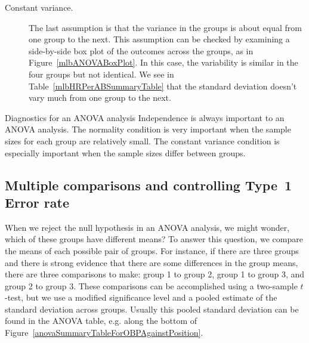 \begin{description}
\item[Constant variance.]
    The last assumption is that the variance in the
    groups is about equal from one group to the next.
    This assumption can be checked by examining a
    side-by-side box plot of the outcomes across the
    groups, as in Figure~\vref{mlbANOVABoxPlot}.
    In this case, the variability is similar in the
    four groups but not identical.
    We see in Table~\vref{mlbHRPerABSummaryTable}
    that the standard deviation doesn't vary much
    from one group to the next.


\end{description}

\begin{onebox}{Diagnostics for an ANOVA analysis}
  Independence is always important to an ANOVA analysis.
  The normality condition is very important when the sample
  sizes for each group are relatively small.
  The constant variance condition is especially important
  when the sample sizes differ between groups.
\end{onebox}


\subsection{Multiple comparisons and controlling Type~1 Error rate}
\label{multipleComparisonsAndControllingTheType1ErrorRate}


When we reject the null hypothesis in an ANOVA analysis, we might wonder, which of these groups have different means? To answer this question, we compare the means of each possible pair of groups. For instance, if there are three groups and there is strong evidence that there are some differences in the group means, there are three comparisons to make: group 1 to group 2, group 1 to group 3, and group 2 to group 3. These comparisons can be accomplished using a two-sample $t$-test, but we use a modified significance level and a pooled estimate of the standard deviation across groups. Usually this pooled standard deviation can be found in the ANOVA table, e.g. along the bottom of Figure~\ref{anovaSummaryTableForOBPAgainstPosition}.

